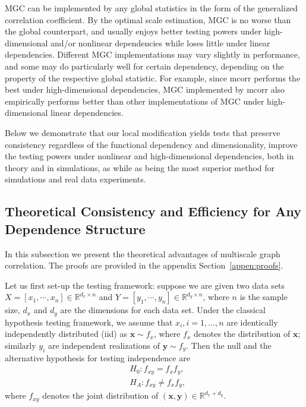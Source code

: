 \documentclass[11pt]{article}
\providecommand{\mb}[1]{\boldsymbol{#1}}
\newcommand{\Real}{\mathbb{R}}
\begin{document}
MGC can be implemented by any global statistics in the form of the generalized correlation coefficient. By the optimal scale estimation, MGC is no worse than the global counterpart, and usually enjoys better testing powers under high-dimensional and/or nonlinear dependencies while loses little under linear dependencies. Different MGC implementations may vary slightly in performance, and some may do particularly well for certain dependency, depending on the property of the respective global statistic. For example, since mcorr performs the best under high-dimensional dependencies, MGC implemented by mcorr also empirically performs better than other implementations of MGC under high-dimensional linear dependencies. %

Below we demonstrate that our local modification yields tests that preserve consistency regardless of the functional dependency and dimensionality, improve the testing powers under nonlinear and high-dimensional dependencies, both in theory and in simulations, as while as being the most superior method for simulations and real data experiments.


\subsection{Theoretical Consistency and Efficiency for Any Dependence Structure}
\label{main2}
In this subsection we present the theoretical advantages of multiscale graph correlation. The proofs are provided in the appendix Section~\ref{appen:proofs}. 

Let us first set-up the testing framework: suppose we are given two data sets $X=[x_{1},\cdots, x_{n}] \in \Real^{d_{x} \times n}$ and $Y=[y_{1},\cdots, y_{n}] \in \Real^{d_{y} \times n}$, where $n$ is the sample size, $d_{x}$ and $d_{y}$ are the dimensions for each data set. Under the classical hypothesis testing framework, we assume that $x_{i}, i=1,\ldots,n$ are identically independently distributed (iid) as $\mb{x} \sim f_{x}$, where $f_{x}$ denotes the distribution of $\mb{x}$; similarly $y_{i}$ are independent realizations of $\mb{y} \sim f_{y}$. Then the null and the alternative hypothesis for testing independence are
\begin{align*}
& H_{0}: f_{xy}=f_{x}f_{y},\\
& H_{A}: f_{xy} \neq f_{x}f_{y},
\end{align*}
where $f_{xy}$ denotes the joint distribution of $(\mb{x},\mb{y}) \in \Real^{d_{x} + d_{y}}$. 
\end{document}
